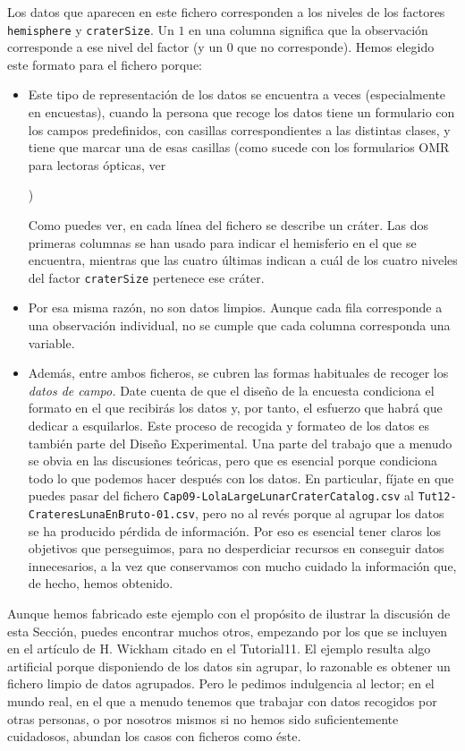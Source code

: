 \documentclass[10pt,a4paper]{article}\usepackage[]{graphicx}\usepackage[]{color}
\newcounter {cont01}
\begin{document}
Los datos que aparecen en este fichero corresponden a los niveles de los factores {\tt hemisphere} y {\tt craterSize}. Un $1$ en una columna significa que la observación corresponde a ese nivel del factor (y  un $0$ que no corresponde). Hemos elegido este formato para el fichero porque:
\begin{itemize}
  \item Este tipo de representación de los datos se encuentra a veces (especialmente en encuestas), cuando la persona que recoge los datos tiene un formulario con los campos predefinidos, con casillas correspondientes a las distintas clases, y tiene que marcar una de esas casillas (como sucede con los formularios OMR para lectoras ópticas, ver
\begin{center}
  )
\end{center}
      Como puedes ver, en cada línea del fichero se describe un cráter. Las dos primeras columnas se han usado para indicar el hemisferio en el que se encuentra, mientras que las cuatro últimas indican a cuál de los cuatro niveles del factor {\tt craterSize} pertenece ese cráter.
  \item Por esa misma razón, no son datos limpios. Aunque cada fila corresponde a una observación individual, no se cumple que cada columna corresponda una variable.
    \item Además, entre ambos ficheros, se cubren las formas habituales de recoger los {\em datos de campo.} Date cuenta de que el diseño de la encuesta condiciona el formato en el que recibirás los datos y, por tanto,  el esfuerzo que habrá que dedicar a esquilarlos. Este proceso de recogida y formateo de los datos es también parte del Diseño Experimental. Una parte del trabajo que a menudo se obvia en las discusiones teóricas, pero que es esencial porque condiciona todo lo que podemos hacer después con los datos. En particular, fíjate en que puedes pasar del fichero {\tt Cap09-LolaLargeLunarCraterCatalog.csv} al {\tt Tut12-CrateresLunaEnBruto-01.csv}, pero no al revés porque al agrupar los datos se ha producido pérdida de información. Por eso es esencial tener claros los objetivos que perseguimos, para no desperdiciar recursos en conseguir datos innecesarios, a la vez que conservamos con mucho cuidado la información que, de hecho, hemos obtenido.

\end{itemize}

Aunque hemos fabricado este ejemplo con el propósito de ilustrar la discusión de esta Sección, puedes encontrar muchos otros, empezando por los que se incluyen en el artículo de H. Wickham citado en el Tutorial11.  El ejemplo resulta algo artificial porque disponiendo de los datos sin agrupar, lo razonable es obtener un fichero limpio de datos agrupados. Pero le pedimos indulgencia al lector; en el mundo real, en el que a menudo tenemos que trabajar con datos recogidos por otras personas, o por nosotros mismos si no hemos sido suficientemente cuidadosos, abundan los casos con ficheros como éste.
\end{document}
